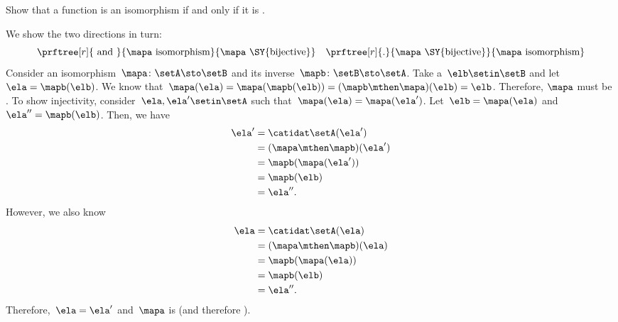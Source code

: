 \begin{exercise}
    \label{ex:bijective-functions-are-isomorphisms}
    Show that a function is an isomorphism if and only if it is .
\end{exercise}
\begin{solution}
    We show the two directions in turn:
    \begin{equation}
        \prftree[r]{\text{ and }}{\mapa \text{ isomorphism}}{\mapa \text{ \SY{bijective}}} \quad \prftree[r]{.
        }{\mapa \text{ \SY{bijective}}}{\mapa \text{ isomorphism}}
    \end{equation}
    Consider an isomorphism~$\mapa\colon \setA \sto \setB$ and its inverse~$\mapb\colon \setB \sto \setA$.
    Take a~$\elb\setin\setB$ and let~$\ela= \mapb(\elb)$.
    We know that~$\mapa(\ela)=\mapa(\mapb(\elb))=(\mapb\mthen \mapa)(\elb)=\elb$.
    Therefore, $\mapa$ must be \emph{}.
    To show injectivity, consider~$\ela,\ela'\setin\setA$ such that~$\mapa(\ela)=\mapa(\ela')$.
    Let~$\elb=\mapa(\ela)$ and~$\ela''=\mapb(\elb)$.
    Then, we have
    \begin{equation}
        \begin{aligned}
            \ela' & =\catidat\setA(\ela') \\
                  & =(\mapa \mthen \mapb)(\ela') \\
                  & =\mapb(\mapa(\ela')) \\
                  & =\mapb(\elb) \\
                  & =\ela''.
        \end{aligned}
    \end{equation}
    However, we also know
    \begin{equation}
        \begin{aligned}
            \ela & =\catidat\setA(\ela) \\
                 & =(\mapa \mthen \mapb)(\ela) \\
                 & =\mapb(\mapa(\ela)) \\
                 & =\mapb(\elb) \\
                 & =\ela''.
        \end{aligned}
    \end{equation}
    Therefore,~$\ela=\ela'$ and~$\mapa$ is  (and therefore ).


\end{solution}
